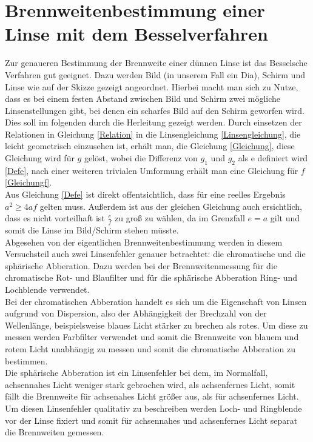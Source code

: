 \section{Brennweitenbestimmung einer Linse mit dem Besselverfahren}

Zur genaueren Bestimmung der Brennweite einer dünnen Linse ist das Besselsche Verfahren gut geeignet. Dazu werden Bild (in unserem Fall ein Dia), Schirm und Linse wie auf der Skizze gezeigt angeordnet. Hierbei macht man sich zu Nutze, dass es bei einem festen Abstand zwischen Bild und Schirm zwei mögliche Linsenstellungen gibt, bei denen ein scharfes Bild auf den Schirm geworfen wird. Dies soll im folgenden durch die Herleitung gezeigt werden. Durch einsetzen der Relationen in Gleichung \ref{Relation} in die Linsengleichung \ref{Linsengleichung}, die leicht geometrisch einzusehen ist, erhält man, die Gleichung \ref{Gleichung}, diese Gleichung wird für $g$ gelöst, wobei die Differenz von $g_1$ und $g_2$ als e definiert wird \ref{Defe}, nach einer weiteren trivialen Umformung erhält man eine Gleichung für $f$ \ref{Gleichungf}.\\
Aus Gleichung \ref{Defe} ist direkt offentsichtlich, dass für eine reelles Ergebnis $a^2 \geq 4af$ gelten muss. Außerdem ist aus der gleichen Gleichung auch ersichtlich, dass es nicht vorteilhaft ist $\frac{e}{f}$ zu groß zu wählen, da im Grenzfall $e = a$ gilt und somit die Linse im Bild/Schirm stehen müsste. \\
Abgesehen von der eigentlichen Brennweitenbestimmung werden in diesem Versuchsteil auch zwei Linsenfehler genauer betrachtet: die chromatische und die sphärische Abberation. Dazu werden bei der Brennweitenmessung für die chromatische Rot- und Blaufilter und für die sphärische Abberation Ring- und Lochblende verwendet.\\
Bei der chromatischen Abberation handelt es sich um die Eigenschaft von Linsen aufgrund von Dispersion, also der Abhängigkeit der Brechzahl von der Wellenlänge, beispielsweise blaues Licht stärker zu brechen als rotes. Um diese zu messen werden Farbfilter verwendet und somit die Brennweite von blauem und rotem Licht unabhängig zu messen und somit die chromatische Abberation zu bestimmen.\\
Die sphärische Abberation ist ein Linsenfehler bei dem, im Normalfall, achsennahes Licht weniger stark gebrochen wird, als achsenfernes Licht, somit fällt die Brennweite für achsenahes Licht größer aus, als für achsenfernes Licht. Um diesen Linsenfehler qualitativ zu beschreiben werden Loch- und Ringblende vor der Linse fixiert und somit für achsennahes und achsenfernes Licht separat die Brennweiten gemessen.\\

